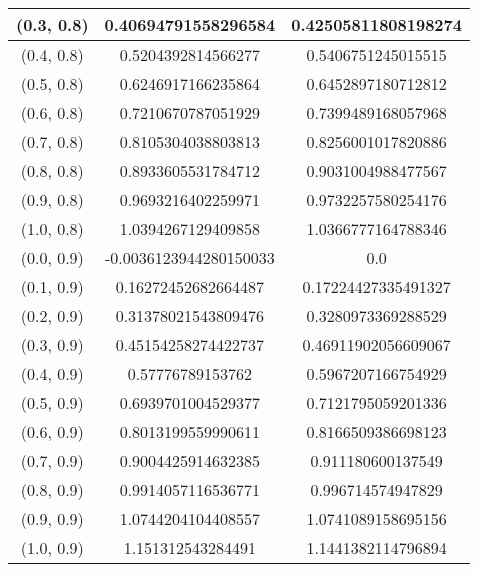 \begin{table}[H]
\begin{tabular}{|c|c|c|}
\hline
(0.3, 0.8) & 0.40694791558296584 & 0.42505811808198274 \\
\hline
(0.4, 0.8) & 0.5204392814566277 & 0.5406751245015515 \\
\hline
(0.5, 0.8) & 0.6246917166235864 & 0.6452897180712812 \\
\hline
(0.6, 0.8) & 0.7210670787051929 & 0.7399489168057968 \\
\hline
(0.7, 0.8) & 0.8105304038803813 & 0.8256001017820886 \\
\hline
(0.8, 0.8) & 0.8933605531784712 & 0.9031004988477567 \\
\hline
(0.9, 0.8) & 0.9693216402259971 & 0.9732257580254176 \\
\hline
(1.0, 0.8) & 1.0394267129409858 & 1.0366777164788346 \\
\hline
\hline
(0.0, 0.9) & -0.0036123944280150033 & 0.0 \\
\hline
(0.1, 0.9) & 0.16272452682664487 & 0.17224427335491327 \\
\hline
(0.2, 0.9) & 0.31378021543809476 & 0.3280973369288529 \\
\hline
(0.3, 0.9) & 0.45154258274422737 & 0.46911902056609067 \\
\hline
(0.4, 0.9) & 0.57776789153762 & 0.5967207166754929 \\
\hline
(0.5, 0.9) & 0.6939701004529377 & 0.7121795059201336 \\
\hline
(0.6, 0.9) & 0.8013199559990611 & 0.8166509386698123 \\
\hline
(0.7, 0.9) & 0.9004425914632385 & 0.911180600137549 \\
\hline
(0.8, 0.9) & 0.9914057116536771 & 0.996714574947829 \\
\hline
(0.9, 0.9) & 1.0744204104408557 & 1.0741089158695156 \\
\hline
(1.0, 0.9) & 1.151312543284491 & 1.1441382114796894 \\
\hline
\end{tabular}
\end{table}
